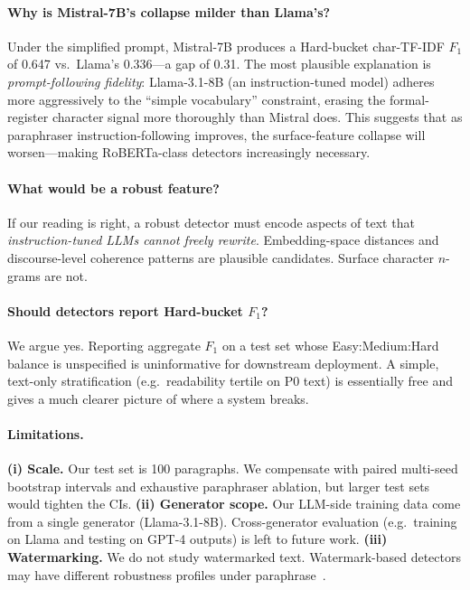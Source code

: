 \documentclass[11pt,a4paper]{article}
\begin{document}
\paragraph{Why is Mistral-7B's collapse milder than Llama's?}
Under the simplified prompt, Mistral-7B produces a Hard-bucket char-TF-IDF
$F_1$ of 0.647 vs.\ Llama's 0.336—a gap of 0.31. The most plausible
explanation is \emph{prompt-following fidelity}: Llama-3.1-8B (an
instruction-tuned model) adheres more aggressively to the ``simple
vocabulary'' constraint, erasing the formal-register character signal more
thoroughly than Mistral does. This suggests that as paraphraser instruction-following
improves, the surface-feature collapse will worsen—making RoBERTa-class
detectors increasingly necessary.

\paragraph{What would be a robust feature?}
If our reading is right, a robust detector must encode aspects of text that
\emph{instruction-tuned LLMs cannot freely rewrite}. Embedding-space
distances and discourse-level coherence patterns are plausible candidates.
Surface character $n$-grams are not.

\paragraph{Should detectors report Hard-bucket $F_1$?}
We argue yes. Reporting aggregate $F_1$ on a test set whose Easy:Medium:Hard
balance is unspecified is uninformative for downstream deployment. A simple,
text-only stratification (e.g.\ readability tertile on P0 text) is essentially
free and gives a much clearer picture of where a system breaks.

\paragraph{Limitations.}
\textbf{(i) Scale.} Our test set is 100 paragraphs. We compensate with paired
multi-seed bootstrap intervals and exhaustive paraphraser ablation, but
larger test sets would tighten the CIs.
\textbf{(ii) Generator scope.} Our LLM-side training data come from a single
generator (Llama-3.1-8B). Cross-generator evaluation (e.g.\ training on
Llama and testing on GPT-4 outputs) is left to future work.
\textbf{(iii) Watermarking.} We do not study watermarked text. Watermark-based
detectors may have different robustness profiles under
paraphrase~\citep{krishna2023paraphrasing}.
\end{document}
